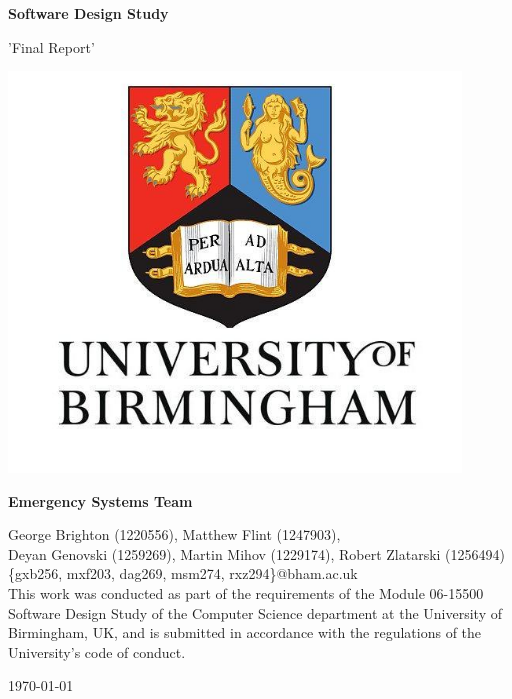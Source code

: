 \documentclass{article}
\begin{document}
    \begin{center}
        \LARGE
        \textbf{Software Design Study}
        
        \vspace{0.2cm}
        \large
        'Final Report'
        
        \vspace{1cm}
        \includegraphics[width=0.9\textwidth]{university}

        \vfill
        
        \large
        \textbf{Emergency Systems Team}
        
        \vspace{0.3cm}
        \normalsize
		George Brighton (1220556), Matthew Flint (1247903),\\
		Deyan Genovski (1259269), Martin Mihov (1229174), Robert Zlatarski (1256494)\\
		\{gxb256, mxf203, dag269, msm274, rxz294\}@bham.ac.uk\\
        
        \vspace{0.5cm}
		This work was conducted as part of the requirements of the Module 06-15500 Software Design Study of the Computer Science department at the University of Birmingham, UK, and is submitted in accordance with the regulations of the University's code of conduct.
		
		\vspace{0.2cm}
		\today
		
    \end{center}
    \newpage
\end{document}

